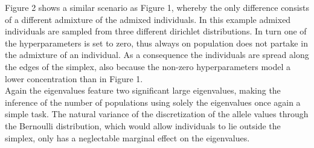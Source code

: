 \documentclass[a4paper, 11pt]{article}
\begin{document}
Figure 2 shows a similar scenario as Figure 1, whereby the only difference consists of a different admixture of the admixed individuals. In this example admixed individuals are sampled from three different dirichlet distributions. In turn one of the hyperparameters is set to zero, thus always on population does not partake in the admixture of an individual. As a consequence the individuals are spread along the edges of the simplex, also because the non-zero hyperparameters model a lower concentration than in Figure 1. \\
Again the eigenvalues feature two significant large eigenvalues, making the inference of the number of populations using solely the eigenvalues once again a simple task. The natural variance of the discretization of the allele values through the Bernoulli distribution, which would allow individuals to lie outside the simplex, only has a neglectable marginal effect on the eigenvalues.
\end{document}
